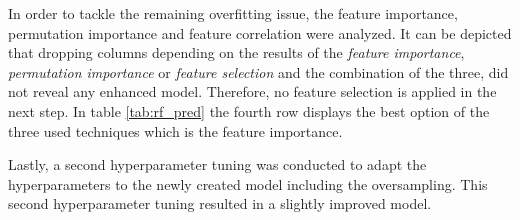 In order to tackle the remaining overfitting issue, the feature importance, permutation importance and feature correlation were analyzed. \citep{Piotri2020} It can be depicted that dropping columns depending on the results of the \textit{feature importance}, \textit{permutation importance} or \textit{feature selection} and the combination of the three, did not reveal any enhanced model. Therefore, no feature selection is applied in the next step. In table \ref{tab:rf_pred} the fourth row displays the best option of the three used techniques which is the feature importance.

Lastly, a second hyperparameter tuning was conducted to adapt the hyperparameters to the newly created model including the oversampling. This second hyperparameter tuning resulted in a slightly improved model.







